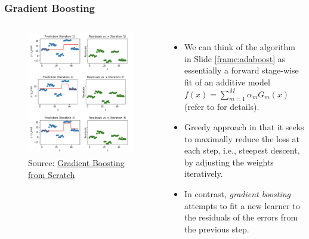\documentclass[aspectratio=169]{beamer}
\begin{document}
\begin{frame}
\frametitle{Gradient Boosting}
\begin{columns}
\begin{figure}
    \centering
    \includegraphics[width=\textwidth]{figures/gradientboostingalgo.png}
    \caption{Source: \href{https://medium.com/mlreview/gradient-boosting-from-scratch-1e317ae4587d}{Gradient Boosting from Scratch}}
\end{figure}
    \begin{itemize}
        \item We can think of the algorithm in Slide \ref{frame:adaboost} as essentially a forward stage-wise fit of an additive model $f(x) = \sum_{m=1}^M \alpha_m G_m(x)$ (refer to \cite{hastieElementsStatisticalLearning2016} for details).
        \item Greedy approach in that it seeks to maximally reduce the loss at each step, i.e., steepest descent, by adjusting the weights iteratively.
        \item In contrast, \textit{gradient boosting} attempts to fit a new learner to the residuals of the errors from the previous step. 
    \end{itemize}
\end{columns}
\end{frame}
\end{document}

